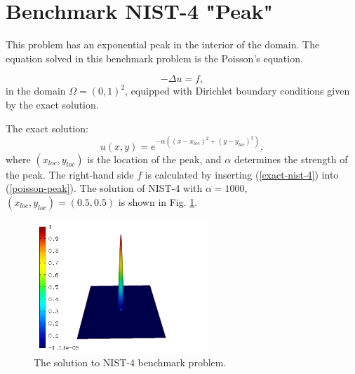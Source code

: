 \section{Benchmark NIST-4 "Peak"}
\label{sec:bench-4}

This problem has an exponential peak in the interior of the domain.
The equation solved in this benchmark problem is the Poisson's equation.

\begin{equation} \label{poisson-peak}
-\Delta u = f,
\end{equation}
in the domain $\Omega = (0, 1)^2$, equipped with Dirichlet
boundary conditions given by the exact solution.

The exact solution:
\begin{equation}\label{exact-nist-4}
u(x,y) = e^{-\alpha ((x - x_{loc})^{2} + (y - y_{loc})^{2})},
\end{equation}
where $(x_{loc}, y_{loc})$ is the location of the peak, and $\alpha$ determines the strength of the peak.
The right-hand side $f$ is calculated by inserting (\ref{exact-nist-4}) into (\ref{poisson-peak}).
The solution of NIST-4 with $\alpha = 1000$, $(x_{loc}, y_{loc}) = (0.5, 0.5)$ is shown in Fig. \ref{fig:sln-nist04}.

\begin{figure}[!ht]
\centering
\includegraphics[height=5cm]{nist/nist-4/solution.png}
\caption{The solution to NIST-4 benchmark problem.}
\label{fig:sln-nist04}
\end{figure}
